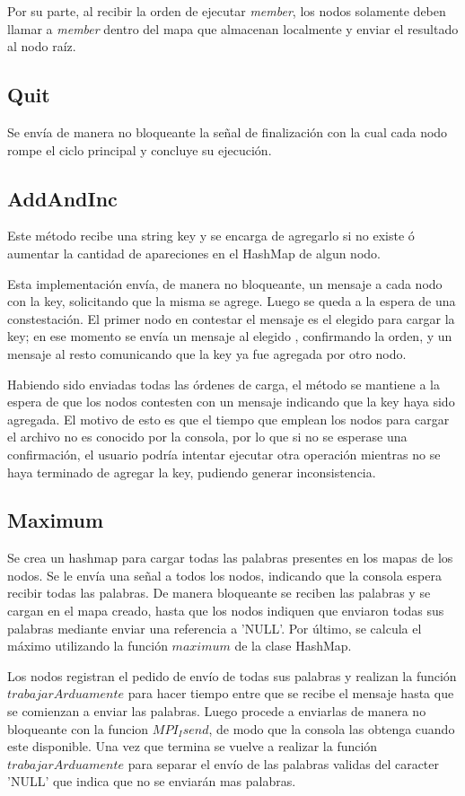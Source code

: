 Por su parte, al recibir la orden de ejecutar \textit{member}, los nodos
solamente deben llamar a \textit{member} dentro del mapa que almacenan
localmente y enviar el resultado al nodo raíz.

\subsection{Quit}

Se envía de manera no bloqueante la señal de finalización con la cual cada
nodo rompe el ciclo principal y concluye su ejecución.

\subsection{AddAndInc}

Este método recibe una string key y se encarga de agregarlo si no existe ó
aumentar la cantidad de apareciones en el HashMap de algun nodo.

Esta implementación envía, de manera no bloqueante, un mensaje a cada nodo con
la key, solicitando que la misma se agrege. Luego se queda a la espera de una
constestación.  El primer nodo en contestar el mensaje es el elegido para
cargar la key; en ese momento se envía un mensaje al elegido , confirmando
la orden, y un mensaje al resto comunicando que la key ya fue agregada por
otro  nodo.

Habiendo sido enviadas todas las órdenes de carga, el método se mantiene a la
espera de que los nodos contesten con un mensaje indicando que la key haya
sido agregada. El motivo de esto es que el tiempo que emplean los nodos para
cargar el archivo no es conocido por la consola, por lo que si no se esperase
una confirmación, el usuario podría intentar ejecutar otra operación mientras
no se haya terminado de agregar la key, pudiendo generar inconsistencia.

\subsection{Maximum}

Se crea un hashmap para cargar todas las palabras presentes en los mapas de
los nodos. Se le envía una señal a todos los nodos, indicando que la consola espera
recibir todas las palabras. De manera bloqueante se reciben las palabras
y se cargan en el mapa creado, hasta que los nodos indiquen que enviaron todas sus
palabras mediante enviar una referencia a 'NULL'. Por último, se calcula el máximo
utilizando la función $maximum$ de la clase HashMap.


Los nodos registran el pedido de envío de todas sus palabras y realizan la función
$trabajarArduamente$ para hacer tiempo entre que se recibe el mensaje hasta que
se comienzan a enviar las palabras. Luego procede a enviarlas de manera no bloqueante
con la funcion $MPI_Isend$, de modo que la consola las obtenga cuando este disponible.
Una vez que termina se vuelve a realizar la función $trabajarArduamente$ para separar
el envío de las palabras validas del caracter 'NULL' que indica que no se enviarán mas palabras.
